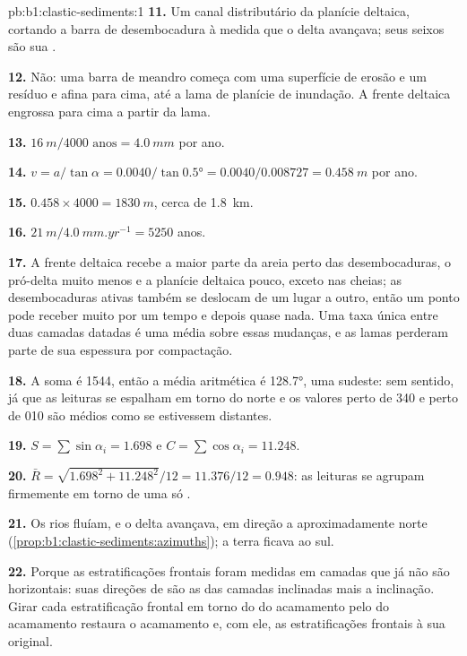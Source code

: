 \begin{solution}{pb:b1:clastic-sediments:1}
\textbf{11.} Um canal distributário da planície deltaica, cortando a barra de
desembocadura à medida que o delta avançava; seus seixos são sua .

\textbf{12.} Não: uma barra de meandro começa com uma superfície de erosão e um resíduo e
afina para cima, até a lama de planície de inundação. A frente deltaica engrossa para
cima a partir da lama.

\textbf{13.} $\qty{16}{m}/\num{4000}\text{ anos} = \qty{4.0}{mm}$ por ano.

\textbf{14.} $v = a/\tan\alpha = 0.0040/\tan\ang{0.5} = 0.0040/0.008727 =
\qty{0.458}{m}$ por ano.

\textbf{15.} $0.458 \times 4000 = \qty{1830}{m}$, cerca de \qty{1.8}{km}.

\textbf{16.} $\qty{21}{m}/\qty{4.0}{mm.yr^{-1}} = 5250$ anos.

\textbf{17.} A frente deltaica recebe a maior parte da areia perto das desembocaduras, o
pró-delta muito menos e a planície deltaica pouco, exceto nas cheias; as desembocaduras
ativas também se deslocam de um lugar a outro, então um ponto pode receber muito por um
tempo e depois quase nada. Uma taxa única entre duas camadas datadas é uma média sobre
essas mudanças, e as lamas perderam parte de sua espessura por compactação.

\textbf{18.} A soma é 1544, então a média aritmética é \ang{128.7}, uma  sudeste:
sem sentido, já que as leituras se espalham em torno do norte e os valores perto de 340
e perto de 010 são médios como se estivessem distantes.

\textbf{19.} $S = \sum\sin\alpha_i = 1.698$ e $C = \sum\cos\alpha_i =
11.248$.

\textbf{20.} $\bar R = \sqrt{1.698^2 + 11.248^2}/12 = 11.376/12 = 0.948$: as leituras se
agrupam firmemente em torno de uma só .

\textbf{21.} Os rios fluíam, e o delta avançava, em direção a aproximadamente norte
(\cref{prop:b1:clastic-sediments:azimuths}); a terra ficava ao sul.

\textbf{22.} Porque as estratificações frontais foram medidas em camadas que já não são
horizontais: suas direções de  são as das camadas inclinadas mais a inclinação.
Girar cada estratificação frontal em torno do  do acamamento pelo  do
acamamento restaura o acamamento e, com ele, as estratificações frontais à sua 
original.


\end{solution}
